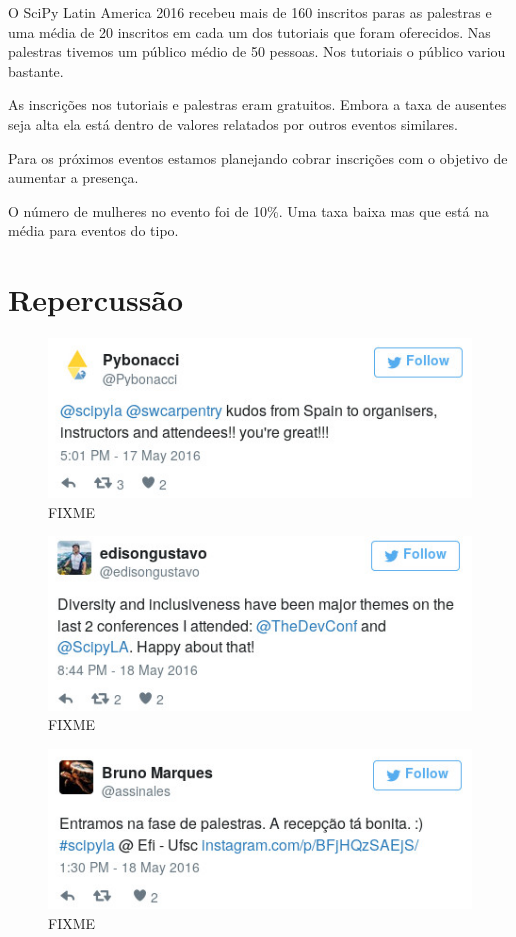 \documentclass[12pt]{article}
\begin{document}
O SciPy Latin America 2016 recebeu mais de 160 inscritos paras as palestras e
uma média de 20 inscritos em cada um dos tutoriais que foram oferecidos.
Nas palestras tivemos um público médio de 50 pessoas. Nos tutoriais o público
variou bastante.

As inscrições nos tutoriais e palestras eram gratuitos. Embora a taxa de
ausentes seja alta ela está dentro de valores relatados por outros eventos
similares.

Para os próximos eventos estamos planejando cobrar inscrições com o objetivo de
aumentar a presença.

O número de mulheres no evento foi de 10\%. Uma taxa baixa mas que está na média
para eventos do tipo.

\newpage

\section*{Repercussão}

\begin{figure}[!htb]
\center
\includegraphics[height=.3\textheight]{tweet-kudos.jpg}
\caption{FIXME}
\end{figure}

\begin{figure}[!htb]
\center
\includegraphics[height=.3\textheight]{tweet-diversidade.jpg}
\caption{FIXME}
\end{figure}


\begin{figure}[!htb]
\center
\includegraphics[height=.3\textheight]{tweet-recepcao.jpg}
\caption{FIXME}
\end{figure}
\end{document}
